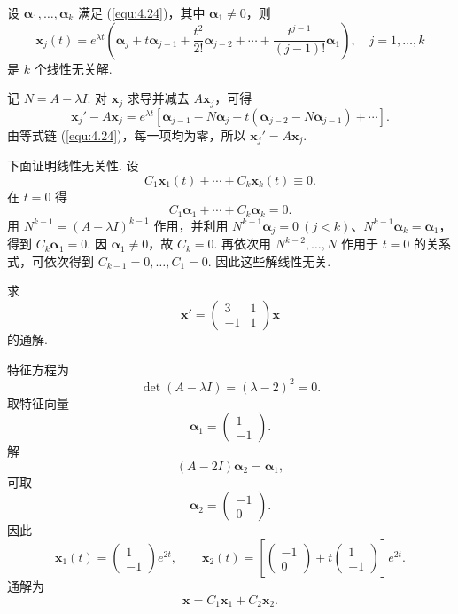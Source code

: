 \begin{thm}\label{thm:4.4.2}
设 $\bm{\alpha}_1,\ldots,\bm{\alpha}_k$ 满足
(\ref{equ:4.24})，其中 $\bm{\alpha}_1\ne0$，则
\begin{equation}\label{equ:4.25}
\bm{x}_j(t)
=e^{\lambda t}\left(
\bm{\alpha}_j+t\bm{\alpha}_{j-1}
+\frac{t^2}{2!}\bm{\alpha}_{j-2}
+\cdots
+\frac{t^{j-1}}{(j-1)!}\bm{\alpha}_1
\right),
\quad j=1,\ldots,k
\end{equation}
是 $k$ 个线性无关解.
\end{thm}

\begin{pf1}
记 $N=A-\lambda I$. 对 $\bm{x}_j$ 求导并减去 $A\bm{x}_j$，可得
\[
\bm{x}_j'-A\bm{x}_j
=e^{\lambda t}\left[
\bm{\alpha}_{j-1}-N\bm{\alpha}_j
+t(\bm{\alpha}_{j-2}-N\bm{\alpha}_{j-1})
+\cdots
\right].
\]
由等式链 (\ref{equ:4.24})，每一项均为零，所以
$\bm{x}_j'=A\bm{x}_j$.

下面证明线性无关性. 设
\[
C_1\bm{x}_1(t)+\cdots+C_k\bm{x}_k(t)\equiv0.
\]
在 $t=0$ 得
\[
C_1\bm{\alpha}_1+\cdots+C_k\bm{\alpha}_k=0.
\]
用 $N^{k-1}=(A-\lambda I)^{k-1}$ 作用，并利用
$N^{k-1}\bm{\alpha}_j=0\ (j<k)$、$N^{k-1}\bm{\alpha}_k=\bm{\alpha}_1$，
得到 $C_k\bm{\alpha}_1=0$. 因 $\bm{\alpha}_1\ne0$，故 $C_k=0$.
再依次用 $N^{k-2},\ldots,N$ 作用于 $t=0$ 的关系式，可依次得到
$C_{k-1}=0,\ldots,C_1=0$. 因此这些解线性无关.
\end{pf1}

\begin{eg}
求
\[
\bm{x}'=
\begin{pmatrix}
3&1\\
-1&1
\end{pmatrix}\bm{x}
\]
的通解.
\begin{pf2}
特征方程为
\[
\det(A-\lambda I)=(\lambda-2)^2=0.
\]
取特征向量
\[
\bm{\alpha}_1=
\begin{pmatrix}1\\-1\end{pmatrix}.
\]
解
\[
(A-2I)\bm{\alpha}_2=\bm{\alpha}_1,
\]
可取
\[
\bm{\alpha}_2=
\begin{pmatrix}-1\\0\end{pmatrix}.
\]
因此
\[
\bm{x}_1(t)=
\begin{pmatrix}1\\-1\end{pmatrix}e^{2t},
\qquad
\bm{x}_2(t)=
\left[
\begin{pmatrix}-1\\0\end{pmatrix}
+t\begin{pmatrix}1\\-1\end{pmatrix}
\right]e^{2t}.
\]
通解为
\[
\bm{x}=C_1\bm{x}_1+C_2\bm{x}_2.
\]
\end{pf2}
\end{eg}

